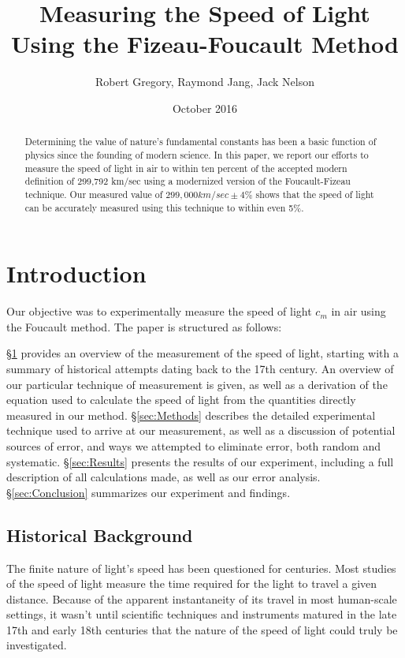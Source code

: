 \documentclass[twocolumn]{article}
\begin{document}
	
\title{Measuring the Speed of Light Using the Fizeau-Foucault Method}
\author{Robert Gregory, Raymond Jang, Jack Nelson}
\date{October 2016}

\maketitle
\begin{abstract}
	Determining the value of nature's fundamental constants has been a basic function of physics since the founding of modern science.
	In this paper, we report our efforts to measure the speed of light in air to within ten percent of the accepted modern definition of 299,792 km/sec using a modernized version of the Foucault-Fizeau technique.
	Our measured value of $299,000 km/sec \pm 4\%$ shows that the speed of light can be accurately measured using this technique to within even 5\%.
\end{abstract}	
\section{Introduction}
	\label{sec:Intro}
	Our objective was to experimentally measure the speed of light $c_m$ in air using the Foucault method. 
	The paper is structured as follows:
	
	\S\ref{sec:Intro} provides an overview of the measurement of the speed of light, starting with a summary of historical attempts dating back to the 17th century.
	An overview of our particular technique of measurement is given, as well as a derivation of the equation used to calculate the speed of light from the quantities directly measured in our method.
	\S\ref{sec:Methods} describes the detailed experimental technique used to arrive at our measurement, as well as a discussion of potential sources of error, and ways we attempted to eliminate error, both random and systematic.
	\S\ref{sec:Results} presents the results of our experiment, including a full description of all calculations made, as well as our error analysis.
	\S\ref{sec:Conclusion} summarizes our experiment and findings.
		
	\subsection{Historical Background}
	
		The finite nature of light's speed has been questioned for centuries. 
		Most studies of the speed of light measure the time required for the light to travel a given distance. 
		Because of the apparent instantaneity of its travel in most human-scale settings, it wasn’t until scientific techniques and instruments matured in the late 17th and early 18th centuries that the nature of the speed of light could truly be investigated. 
		
\end{document}

